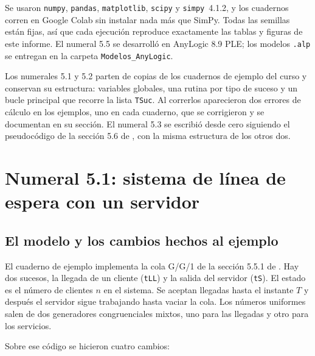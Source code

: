 \documentclass[11pt,letterpaper]{article}
\begin{document}
Se usaron \texttt{numpy}, \texttt{pandas}, \texttt{matplotlib}, \texttt{scipy} y \texttt{simpy}~4.1.2, y los
cuadernos corren en Google Colab sin instalar nada más que SimPy. Todas las semillas están fijas, así que cada
ejecución reproduce exactamente las tablas y figuras de este informe. El numeral 5.5 se desarrolló en AnyLogic
8.9 PLE; los modelos \texttt{.alp} se entregan en la carpeta \texttt{Modelos\_AnyLogic}.

Los numerales 5.1 y 5.2 parten de copias de los cuadernos de ejemplo del curso y conservan su estructura:
variables globales, una rutina por tipo de suceso y un bucle principal que recorre la lista \texttt{TSuc}. Al
correrlos aparecieron dos errores de cálculo en los ejemplos, uno en cada cuaderno, que se corrigieron y se
documentan en su sección. El numeral 5.3 se escribió desde cero siguiendo el pseudocódigo de la sección 5.6 de
\cite{rios08}, con la misma estructura de los otros dos.

\section{Numeral 5.1: sistema de línea de espera con un servidor}

\subsection{El modelo y los cambios hechos al ejemplo}

El cuaderno de ejemplo implementa la cola G/G/1 de la sección 5.5.1 de \cite{rios08}. Hay dos sucesos, la
llegada de un cliente (\texttt{tLL}) y la salida del servidor (\texttt{tS}). El estado es el número de
clientes $n$ en el sistema. Se aceptan llegadas hasta el instante $T$ y después el servidor sigue trabajando
hasta vaciar la cola. Los números uniformes salen de dos generadores congruenciales mixtos, uno para las
llegadas y otro para los servicios.

Sobre ese código se hicieron cuatro cambios:
\end{document}
